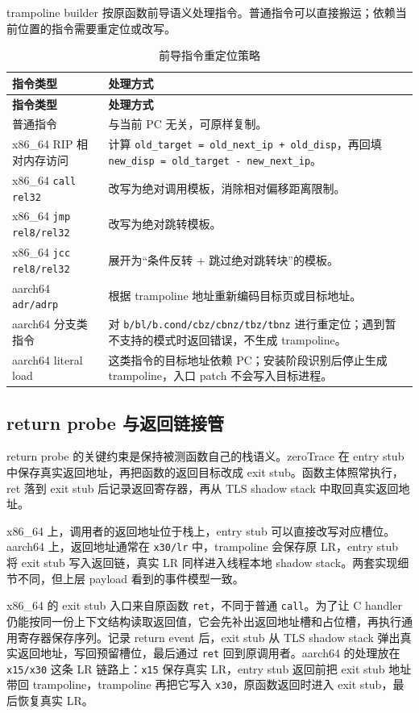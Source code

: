 \documentclass[UTF8,a4paper,11pt,fontset=fandol]{ctexart}
\newcommand{\code}[1]{\texttt{#1}}
\begin{document}
trampoline builder 按原函数前导语义处理指令。普通指令可以直接搬运；依赖当前位置的指令需要重定位或改写。

\begin{longtable}{@{}P{3.3cm}P{12.25cm}@{}}
\caption{前导指令重定位策略}\label{tab:relocation}\\
\toprule
\textbf{指令类型} & \textbf{处理方式}\\
\midrule
\endfirsthead
\toprule
\textbf{指令类型} & \textbf{处理方式}\\
\midrule
\endhead
普通指令 & 与当前 PC 无关，可原样复制。\\
x86\_64 RIP 相对内存访问 & 计算 \code{old\_target = old\_next\_ip + old\_disp}，再回填 \code{new\_disp = old\_target - new\_next\_ip}。\\
x86\_64 \code{call rel32} & 改写为绝对调用模板，消除相对偏移距离限制。\\
x86\_64 \code{jmp rel8/rel32} & 改写为绝对跳转模板。\\
x86\_64 \code{jcc rel8/rel32} & 展开为“条件反转 + 跳过绝对跳转块”的模板。\\
aarch64 \code{adr/adrp} & 根据 trampoline 地址重新编码目标页或目标地址。\\
aarch64 分支类指令 & 对 \code{b/bl/b.cond/cbz/cbnz/tbz/tbnz} 进行重定位；遇到暂不支持的模式时返回错误，不生成 trampoline。\\
aarch64 literal load & 这类指令的目标地址依赖 PC；安装阶段识别后停止生成 trampoline，入口 patch 不会写入目标进程。\\
\bottomrule
\end{longtable}

\subsection{return probe 与返回链接管}

return probe 的关键约束是保持被测函数自己的栈语义。zeroTrace 在 entry stub 中保存真实返回地址，再把函数的返回目标改成 exit stub。函数主体照常执行，ret 落到 exit stub 后记录返回寄存器，再从 TLS shadow stack 中取回真实返回地址。

x86\_64 上，调用者的返回地址位于栈上，entry stub 可以直接改写对应槽位。aarch64 上，返回地址通常在 \code{x30/lr} 中，trampoline 会保存原 LR，entry stub 将 exit stub 写入返回链，真实 LR 同样进入线程本地 shadow stack。两套实现细节不同，但上层 payload 看到的事件模型一致。

x86\_64 的 exit stub 入口来自原函数 \code{ret}，不同于普通 \code{call}。为了让 C handler 仍能按同一份上下文结构读取返回值，它会先补出返回地址槽和占位槽，再执行通用寄存器保存序列。记录 return event 后，exit stub 从 TLS shadow stack 弹出真实返回地址，写回预留槽位，最后通过 \code{ret} 回到原调用者。aarch64 的处理放在 \code{x15/x30} 这条 LR 链路上：\code{x15} 保存真实 LR，entry stub 返回前把 exit stub 地址带回 trampoline，trampoline 再把它写入 \code{x30}，原函数返回时进入 exit stub，最后恢复真实 LR。
\end{document}
